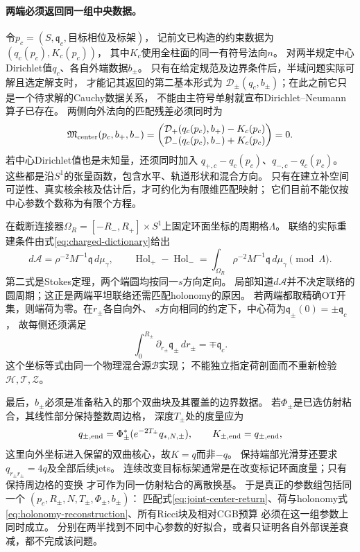 \documentclass[UTF8,a4paper,11pt,fontset=fandol]{ctexart}
\numberwithin{equation}{section}
\theoremstyle{definition}
\begin{document}
\paragraph{两端必须返回同一组中央数据。}
令$p_c=(S,\mathfrak q_c,\text{目标相位及标架})$，
记前文已构造的约束数据为$(q_c(p_c),K_c(p_c))$，
其中$K_c$使用全柱面的同一有符号法向$n$。
对两半规定中心Dirichlet值$q_c$、各自外端数据$b_\pm$。
只有在给定规范及边界条件后，半域问题实际可解且选定解支时，
才能记其返回的第二基本形式为
$\mathcal D_\pm(q_c,b_\pm)$；在此之前它只是一个待求解的Cauchy数据关系，
不能由主符号单射就宣布Dirichlet--Neumann算子已存在。
两侧向外法向的匹配残差必须同时为
\begin{equation}\label{eq:joint-center-return}
 \mathfrak M_{\rm center}(p_c,b_+,b_-)=
 \begin{pmatrix}
 \mathcal D_+(q_c(p_c),b_+)-K_c(p_c)\\
 \mathcal D_-(q_c(p_c),b_-)+K_c(p_c)
 \end{pmatrix}=0.
\end{equation}
若中心Dirichlet值也是未知量，还须同时加入
$q_{+,c}-q_c(p_c)$、$q_{-,c}-q_c(p_c)$。
这些都是沿$S^1$的张量函数，包含水平、轨道形状和混合方向。
只有在建立补空间可逆性、真实核余核及估计后，才可约化为有限维匹配映射；
它们目前不能仅按中心参数个数称为有限个方程。

在截断连接器$\Omega_R=[-R_-,R_+]\times S^1$上固定环面坐标的周期格$\Lambda$。
联络的实际重建条件由式\eqref{eq:charged-dictionary}给出
\begin{equation}\label{eq:holonomy-reconstruction}
 d\mathcal A=\rho^{-2}M^{-1}\mathfrak q\,d\mu_\gamma,\qquad
 \operatorname{Hol}_+-\operatorname{Hol}_-
 =\int_{\Omega_R}\rho^{-2}M^{-1}\mathfrak q\,d\mu_\gamma\pmod\Lambda.
\end{equation}
第二式是Stokes定理，两个端圆均按同一$s$方向定向。
局部知道$d\mathcal A$并不决定联络的圆周期；这正是两端平坦联络还需匹配holonomy的原因。
若两端都取精确OT开集，则端荷为零。在$r_\pm$各自向外、
$s$方向相同的约定下，中心荷为$\mathfrak q_\pm(0)=\pm\mathfrak q_c$，
故每侧还须满足
\[
 \int_0^{R_\pm}\partial_{r_\pm}\mathfrak q_\pm\,dr_\pm
 =\mp\mathfrak q_c.
\]
这个坐标等式由同一个物理混合源$\mathscr B$实现；
不能独立指定荷剖面而不重新检验$\mathscr H,\mathscr T,\mathscr Z$。

最后，$b_\pm$必须是准备粘入的那个双曲块及其覆盖的边界数据。
若$\Phi_\pm$是已选仿射粘合，其线性部分保持整数周边格，
深度$T_\pm$处的度量应为
\begin{equation}\label{eq:affine-end-data}
 q_{\pm,\rm end}
 =\Phi_\pm^*(e^{-2T_\pm}q_{*,N,\pm}),\qquad
 K_{\pm,\rm end}=q_{\pm,\rm end},
\end{equation}
这里向外坐标进入保留的双曲核心，故$K=q$而非$-q$。
保持端部光滑芽还要求$q_{r_\pm r_\pm}=4q$及全部后续jets。
连续改变目标标架通常是在改变标记环面度量；只有保持周边格的变换
才可作为同一仿射粘合的离散换基。
于是真正的参数组包括同一个
$(p_c,R_\pm,N,T_\pm,\Phi_\pm,b_\pm)$：
匹配式\eqref{eq:joint-center-return}、荷与holonomy式
\eqref{eq:holonomy-reconstruction}、所有Ricci块及相对CGB预算
必须在这一组参数上同时成立。
分别在两半找到不同中心参数的好拟合，或者只证明各自外部误差衰减，都不完成该问题。
\end{document}
